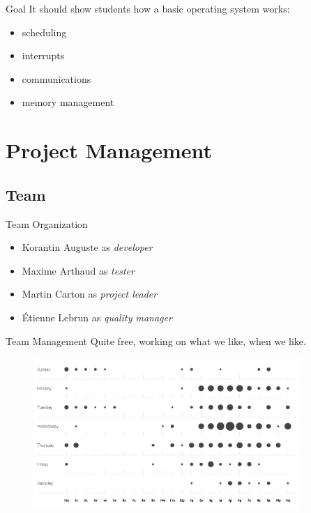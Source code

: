 \documentclass{beamer}
\begin{document}
    \begin{frame}{Goal}
      It should show students how a basic operating system works:
        \begin{itemize}
          \item scheduling
          \item interrupts
          \item communications
          \item memory management
        \end{itemize}
    \end{frame}

  \section{Project Management}
    \subsection{Team}
      \begin{frame}{Team Organization}
        \begin{itemize}
          \item Korantin Auguste as \textit{developer}
          \item Maxime Arthaud as \textit{tester}
          \item Martin Carton as \textit{project leader}
          \item Étienne Lebrun as \textit{quality manager}
        \end{itemize}
      \end{frame}

      \begin{frame}{Team Management}
        Quite free, working on what we like, when we like.

        \pause
        \begin{figure}
          \centering
          \includegraphics[width=0.9\textwidth]{fig/punchcard.png}
        \end{figure}
      \end{frame}
\end{document}
